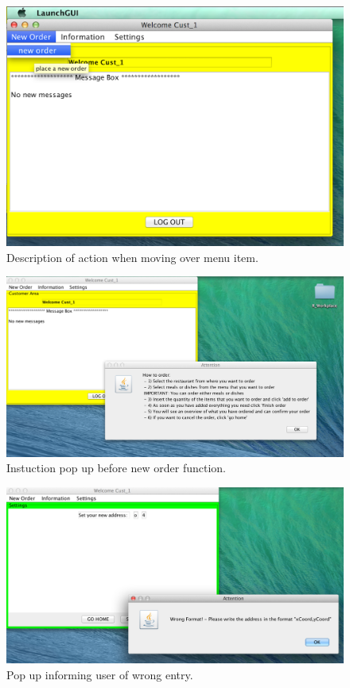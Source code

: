 \begin{figure}
  \begin{center}
    \includegraphics[scale=0.47]{./img/menuBarDescription.png}
    \end{center}
  \caption{Description of action when moving over menu item.}
  \label{fig:menuBarDescription}
\end{figure}
\begin{figure}
  \begin{center}
    \includegraphics[scale=0.37]{./img/instructionPopUp.png}
    \end{center}
  \caption{Instuction pop up before new order function.}
  \label{fig:instructionPopUp}
\end{figure}
\begin{figure}
  \begin{center}
    \includegraphics[scale=0.37]{./img/wrongFormat.png}
    \end{center}
  \caption{Pop up informing user of wrong entry.}
  \label{fig:wrongFormat}
\end{figure}


